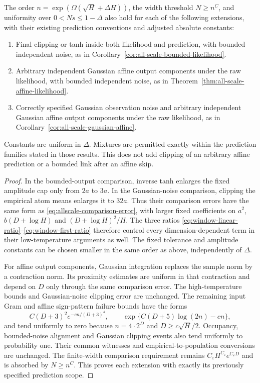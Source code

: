 \begin{corollary}
\label{cor:prefactor-window-extensions}
The order $n=\exp(\Omega(\sqrt H+\Delta H))$, the width threshold $N\ge n^C$, and uniformity over $0<Ns\le1-\Delta$ also hold for each of the following extensions, with their existing prediction conventions and adjusted absolute constants:
\begin{enumerate}
\item Final clipping or tanh inside both likelihood and prediction, with bounded independent noise, as in Corollary~\ref{cor:all-scale-bounded-likelihood}.
\item Arbitrary independent Gaussian affine output components under the raw likelihood, with bounded independent noise, as in Theorem~\ref{thm:all-scale-affine-likelihood}.
\item Correctly specified Gaussian observation noise and arbitrary independent Gaussian affine output components under the raw likelihood, as in Corollary~\ref{cor:all-scale-gaussian-affine}.
\end{enumerate}
Constants are uniform in $\Delta$. Mixtures are permitted exactly within the prediction families stated in those results. This does not add clipping of an arbitrary affine prediction or a bounded link after an affine skip.
\end{corollary}
\begin{proof}
In the bounded-output comparison, inverse tanh enlarges the fixed amplitude cap only from $2a$ to $3a$. In the Gaussian-noise comparison, clipping the empirical atom means enlarges it to $32a$. Thus their comparison errors have the same form as \eqref{eq:allscale-comparison-error}, with larger fixed coefficients on $a^2$, $b(D+\log H)$ and $(D+\log H)^2/H$. The three ratios \eqref{eq:window-linear-ratio}--\eqref{eq:window-first-ratio} therefore control every dimension-dependent term in their low-temperature arguments as well. The fixed tolerance and amplitude constants can be chosen smaller in the same order as above, independently of $\Delta$.

For affine output components, Gaussian integration replaces the sample norm by a contraction norm. Its proximity estimates are uniform in that contraction and depend on $D$ only through the same comparison error. The high-temperature bounds and Gaussian-noise clipping error are unchanged. The remaining input Gram and affine sign-pattern failure bounds have the forms
\[
 C(D+3)^2 e^{-c n/(D+3)^4},\qquad
 \exp\{C(D+5)\log(2n)-c n\},
\]
and tend uniformly to zero because $n=4\cdot2^D$ and $D\ge c\sqrt H/2$. Occupancy, bounded-noise alignment and Gaussian clipping events also tend uniformly to probability one. Their common witnesses and empirical-to-population conversions are unchanged. The finite-width comparison requirement remains $C_\varepsilon H^{C_\varepsilon}e^{C_\varepsilon D}$ and is absorbed by $N\ge n^C$. This proves each extension with exactly its previously specified prediction scope.
\end{proof}
